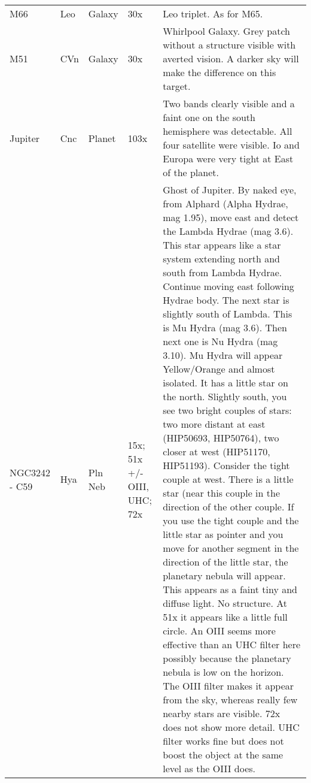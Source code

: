 \begin{longtable}{ p{0.8in}  p{0.3in}  p{0.5in}  p{0.9in}  p{5.8in} }
M66 & Leo & Galaxy & 30x & Leo triplet. As for M65.  \\ 
M51 & CVn & Galaxy & 30x & Whirlpool Galaxy. Grey patch without a structure visible with averted vision. A darker sky will make the difference on this target. \\ 
Jupiter & Cnc & Planet & 103x & Two bands clearly visible and a faint one on the south hemisphere was detectable. All four satellite were visible. Io and Europa were very tight at East of the planet. \\ 
NGC3242 - C59 & Hya & Pln Neb & 15x; 51x +/- OIII, UHC; 72x & Ghost of Jupiter. By naked eye, from Alphard (Alpha Hydrae, mag 1.95), move east and detect the Lambda Hydrae (mag 3.6). This star appears like a star system extending north and south from Lambda Hydrae. Continue moving east following Hydrae body. The next star is slightly south of Lambda. This is Mu Hydra (mag 3.6). Then next one is Nu Hydra (mag 3.10). Mu Hydra will appear Yellow/Orange and almost isolated. It has a little star on the north. Slightly south, you see two bright couples of stars: two more distant at east (HIP50693, HIP50764), two closer at west (HIP51170, HIP51193). Consider the tight couple at west. There is a little star (near this couple in the direction of the other couple. If you use the tight couple and the little star as pointer and you move for another segment in the direction of the little star, the planetary nebula will appear. This appears as a faint tiny and diffuse light. No structure. At 51x it appears like a little full circle. An OIII seems more effective than an UHC filter here possibly because the planetary nebula is low on the horizon. The OIII filter makes it appear from the sky, whereas really few nearby stars are visible. 72x does not show more detail. UHC filter works fine but does not boost the object at the same level as the OIII does. \\ 
\hline 
\end{longtable} 

